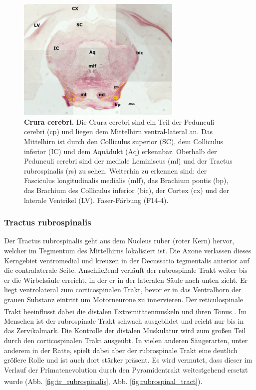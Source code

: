 \documentclass[12pt,a4paper,pdftex]{article}
\begin{document}
\begin{figure}[H]
    \centering
    \includegraphics[width=0.7\textwidth]{pictures/Bilder_Laura/cerebral_peduncle_F14_4P_025x.png}
    \caption[Crura cerebri]{\textbf{Crura cerebri.} Die Crura cerebri sind ein Teil der Pedunculi cerebri (cp) und liegen dem Mittelhirn ventral-lateral an. Das Mittelhirn ist durch den Colliculus superior (SC), dem Colliculus inferior (IC) und dem Aquädukt (Aq) erkennbar. Oberhalb der Pedunculi cerebri sind der mediale Leminiscus (ml) und der Tractus rubrospinalis (rs) zu sehen. Weiterhin zu erkennen sind: der Fasciculus longitudinalis medialis (mlf), das Brachium pontis (bp), das Brachium des Colliculus inferior (bic), der Cortex (cx) und der laterale Ventrikel (LV). Faser-Färbung (F14-4).}
    \label{fig:crura_cerebri}
\end{figure}

\subsubsection{Tractus rubrospinalis} 
Der Tractus rubrospinalis geht aus dem Nucleus ruber (roter Kern) hervor, welcher im Tegmentum des Mittelhirns lokalisiert ist. Die Axone verlassen dieses Kerngebiet ventromedial und kreuzen in der Decussatio tegmentalis anterior auf die contralaterale Seite. Anschließend verläuft der rubrospinale Trakt weiter bis er die Wirbelsäule erreicht, in der er in der lateralen Säule nach unten zieht. Er liegt ventrolateral zum corticospinalen Trakt, bevor er in das Ventralhorn der grauen Substanz eintritt um Motorneurone zu innervieren. Der reticulospinale Trakt beeinflusst dabei die distalen Extremitätenmuskeln und ihren Tonus \textsuperscript{\cite[8]{crossman2014neuroanatomy}}. Im Menschen ist der rubrospinale Trakt schwach ausgebildet und reicht nur bis in das Zervikalmark. Die Kontrolle der distalen Muskulatur wird zum großen Teil durch den corticospinalen Trakt ausgeübt. In vielen anderen Säugerarten, unter anderem in der Ratte, spielt dabei aber der rubrospinale Trakt eine deutlich größere Rolle und ist auch dort stärker präsent. Es wird vermutet, dass dieser im Verlauf der Primatenevolution durch den Pyramidentrakt weitestgehend ersetzt wurde \textsuperscript{\cite[14]{neurowissenschaften_baer}} (Abb. \ref{fig:tr_rubrospinalis}, Abb. \ref{fig:rubrospinal_tract}).    
\end{document}
